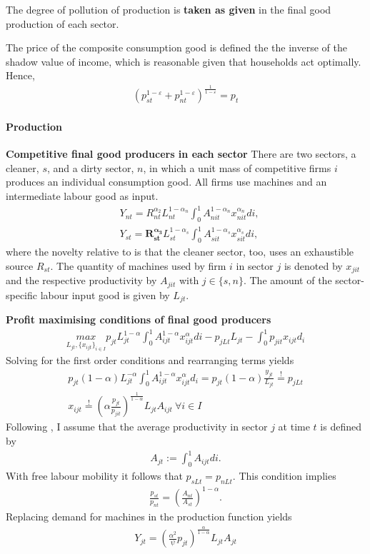 \documentclass[12pt]{article}
\begin{document}
The degree of pollution of production is \textbf{taken as given} in the final good production of each sector. 

The price of the composite consumption good is defined the the inverse of the shadow value of income, which is reasonable given that households act optimally.
Hence,
\begin{align*}
\left(p_{st}^{1-\varepsilon}+p_{nt}^{1-\varepsilon}\right)^\frac{1}{1-\varepsilon}=p_t
\end{align*}
\paragraph{Production}
\noindent\textbf{Competitive final good producers in each sector}
There are two sectors, a cleaner, $s$, and a dirty sector, $n$, in which a unit mass of competitive firms $i$ produces an individual consumption good. All firms use machines and an intermediate labour good as input. 
\begin{align*}
&Y_{nt}=R_{nt}^{\alpha_2} L_{nt}^{1-\alpha_n}\int_{0}^{1}A_{nit}^{1-\alpha_n}x_{nit}^{\alpha_n} di,\\
&Y_{st}=\pmb{R_{st}^{\alpha_3}} L_{st}^{1-\alpha_s}\int_{0}^{1}A_{sit}^{1-\alpha_s}x_{sit}^{\alpha_s} di, 
\end{align*}
where the novelty relative to \cite{Acemoglu2012TheChange} is that the cleaner sector, too, uses an exhaustible source $R_{st}$. 
The quantity of machines used by firm $i$ in sector $j$ is denoted by $x_{jit}$ and the respective productivity by $A_{jit}$ with $j\in\{s,n\}$. The amount of the sector-specific labour input good is given by $L_{jt}$.

\textbf{Profit maximising conditions of final good producers}
\begin{align*}
\underset{L_{jt}, \{x_{ijt}\}_{i \in I}}{max} p_{jt} L_{jt}^{1-\alpha} \int_{0}^{1}A_{ijt}^{1-\alpha}x_{ijt}^\alpha di - p_{jLt} L_{jt} - \int_{0}^{1} p_{jit}x_{ijt} d_i
\end{align*}
Solving for the first order conditions and rearranging terms yields
\begin{align}
p_{jt}(1-\alpha) L_{jt}^{-\alpha}\int_{0}^{1}A_{ijt}^{1-\alpha}x_{ijt}^\alpha d_i= p_{jt} (1-\alpha)\frac{y_{jt}}{L_{jt}}\overset{!}{=}p_{jLt}  \label{eq:foc_demand_L}
\\
x_{ijt} \overset{!}{=} \left(\alpha\frac{p_{jt}}{p_{jit}}\right)^\frac{1}{1-\alpha}L_{jt} A_{ijt}\ \forall i\in I \label{eq:foc_demand_ma}
\end{align}
Following \cite{Acemoglu2012TheChange}, I assume that the average productivity in sector $j$ at time $t$ is defined by
\begin{align*}
A_{jt}:=\int_{0}^{1}A_{ijt}di.
\end{align*}
With free labour mobility it follows that $p_{sLt}=p_{nLt}$. This condition implies
\begin{align*}
\frac{p_{st}}{p_{nt}}=\left(\frac{A_{nt}}{A_{st}}\right)^{1-\alpha}.
\end{align*}
Replacing demand for machines in the production function yields
\begin{align*}
Y_{jt}= \left(\frac{\alpha^2}{\psi}p_{jt}\right)^{\frac{\alpha}{1-\alpha}}L_{jt}A_{jt}
\end{align*}
\end{document}

